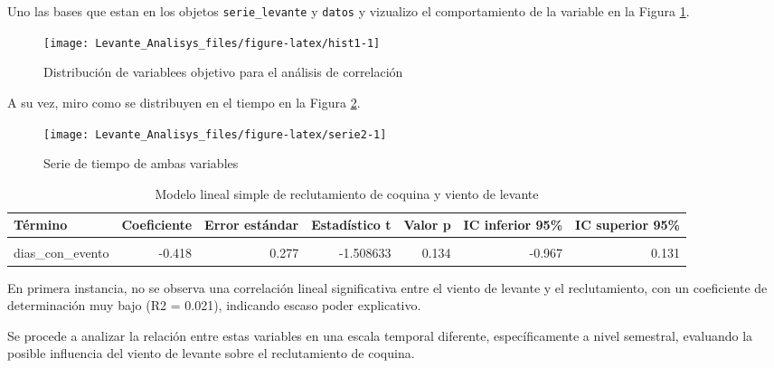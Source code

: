 \documentclass[
]{article}
\begin{document}
Uno las bases que estan en los objetos \texttt{serie\_levante} y \texttt{datos} y vizualizo el comportamiento de la variable en la Figura \ref{fig:hist1}.

\begin{figure}

{\centering \texttt{[image: Levante\_Analisys\_files/figure-latex/hist1-1]} 

}

\caption{Distribución de variablees objetivo para el análisis de correlación}\label{fig:hist1}
\end{figure}

A su vez, miro como se distribuyen en el tiempo en la Figura \ref{fig:serie2}.

\begin{figure}

{\centering \texttt{[image: Levante\_Analisys\_files/figure-latex/serie2-1]} 

}

\caption{Serie de tiempo de ambas variables}\label{fig:serie2}
\end{figure}

\begin{table}[!h]
\centering
\caption{\label{tab:unnamed-chunk-5}Modelo lineal simple de reclutamiento de coquina y viento de levante}
\centering
\begin{tabular}[t]{l|r|r|r|r|r|r}
\hline
Término & Coeficiente & Error estándar & Estadístico t & Valor p & IC inferior 95\% & IC superior 95\%\\
\hline
\cellcolor{gray!10}{(Intercept)} & \cellcolor{gray!10}{24.657} & \cellcolor{gray!10}{2.644} & \cellcolor{gray!10}{9.323810} & \cellcolor{gray!10}{0.000} & \cellcolor{gray!10}{19.413} & \cellcolor{gray!10}{29.901}\\
\hline
dias\_con\_evento & -0.418 & 0.277 & -1.508633 & 0.134 & -0.967 & 0.131\\
\hline
\end{tabular}
\end{table}

En primera instancia, no se observa una correlación lineal significativa entre el viento de levante y el reclutamiento, con un coeficiente de determinación muy bajo (R2 = 0.021), indicando escaso poder explicativo.

Se procede a analizar la relación entre estas variables en una escala temporal diferente, específicamente a nivel semestral, evaluando la posible influencia del viento de levante sobre el reclutamiento de coquina.
\end{document}
